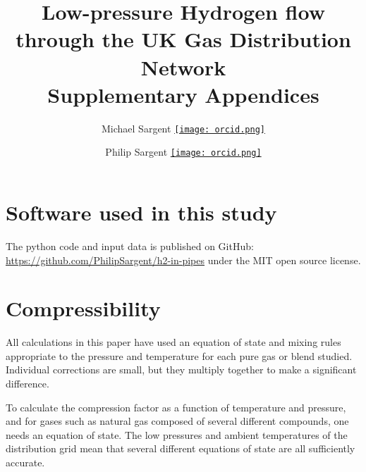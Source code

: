 \documentclass[5p]{elsarticle} %
\newcommand{\orcid}[1]{\href{https://orcid.org/#1}{\texttt{[image: orcid.png]}}}
\begin{document}
\begin{frontmatter}




\title{Low-pressure Hydrogen flow through the UK Gas Distribution Network \\ Supplementary Appendices}

\author[mjs]{Michael Sargent \orcid{0000-0001-9129-2990} }

\author[mjs]{Philip Sargent \orcid{0000-0002-1825-0097}}

\address[mjs]{Cambridge Energy UK, 27 Greville Road, Cambridge CB1 3QJ, UK }


\end{frontmatter}

\appendix

\section{Software used in this study}
\label{sec:oursoftware}

The python code and input data is published on GitHub: \url{https://github.com/PhilipSargent/h2-in-pipes} under the MIT open source license\citep{Sargents_github}.

\section{Compressibility}
\label{appendix:gasprops}

All calculations in this paper have used an equation of state and  mixing rules appropriate to the pressure and temperature for each pure gas or blend studied. Individual corrections are small, but they multiply together to make a significant difference.

To calculate the compression factor as a function of temperature and pressure, and for gases such as natural gas composed of several different compounds, one needs an equation of state.
The low pressures and ambient temperatures of the distribution grid mean that several different equations of state are all sufficiently accurate.
\end{document}
